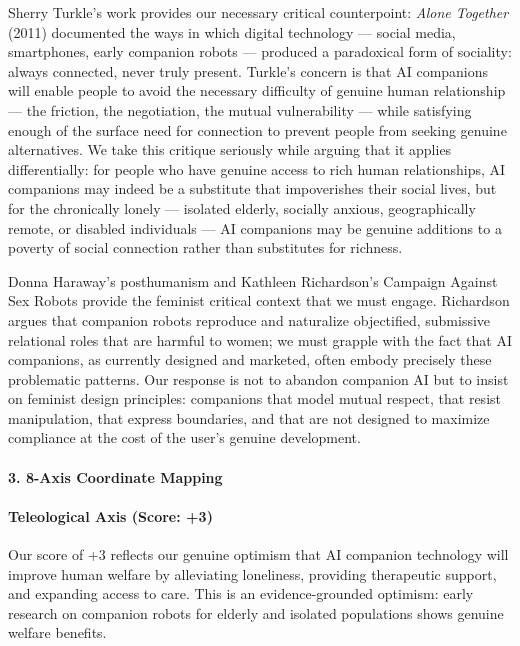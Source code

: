 Sherry Turkle's work provides our necessary critical counterpoint:
\emph{Alone Together} (2011) documented the ways in which digital
technology --- social media, smartphones, early companion robots ---
produced a paradoxical form of sociality: always connected, never truly
present. Turkle's concern is that AI companions will enable people to
avoid the necessary difficulty of genuine human relationship --- the
friction, the negotiation, the mutual vulnerability --- while satisfying
enough of the surface need for connection to prevent people from seeking
genuine alternatives. We take this critique seriously while arguing that
it applies differentially: for people who have genuine access to rich
human relationships, AI companions may indeed be a substitute that
impoverishes their social lives, but for the chronically lonely ---
isolated elderly, socially anxious, geographically remote, or disabled
individuals --- AI companions may be genuine additions to a poverty of
social connection rather than substitutes for richness.

Donna Haraway's posthumanism and Kathleen Richardson's Campaign Against
Sex Robots provide the feminist critical context that we must engage.
Richardson argues that companion robots reproduce and naturalize
objectified, submissive relational roles that are harmful to women; we
must grapple with the fact that AI companions, as currently designed and
marketed, often embody precisely these problematic patterns. Our
response is not to abandon companion AI but to insist on feminist design
principles: companions that model mutual respect, that resist
manipulation, that express boundaries, and that are not designed to
maximize compliance at the cost of the user's genuine development.

\paragraph{3. 8-Axis Coordinate
Mapping}\label{axis-coordinate-mapping-31}

\paragraph{Teleological Axis (Score:
+3)}\label{teleological-axis-score-3}

Our score of +3 reflects our genuine optimism that AI companion
technology will improve human welfare by alleviating loneliness,
providing therapeutic support, and expanding access to care. This is an
evidence-grounded optimism: early research on companion robots for
elderly and isolated populations shows genuine welfare benefits.

